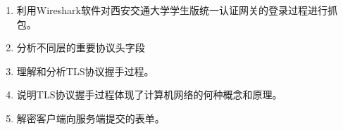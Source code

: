 \begin{enumerate}
	\item 利用Wireshark软件对西安交通大学学生版统一认证网关的登录过程进行抓包。
	\item 分析不同层的重要协议头字段
	\item 理解和分析TLS协议握手过程。
	\item 说明TLS协议握手过程体现了计算机网络的何种概念和原理。
	\item 解密客户端向服务端提交的表单。
\end{enumerate}